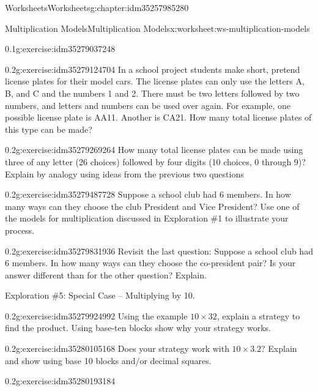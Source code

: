 \documentclass[twoside,11pt,]{book}
\begin{document}
\begin{chapterptx}{Worksheets}{}{Worksheets}{}{}{g:chapter:idm35257985280}
\begin{worksheet-section-numberless}{Multiplication Models}{}{Multiplication Models}{}{}{x:worksheet:ws-multiplication-models}
\begin{divisionexercise}{11}{}{0.1}{g:exercise:idm35279037248}
\end{divisionexercise}%
\clearpage
\begin{divisionexercise}{12}{}{0.2}{g:exercise:idm35279124704}%
In a school project students make short, pretend license plates for their model cars.  The license plates can only use the letters A, B, and C and the numbers 1 and 2.  There must be two letters followed by two numbers, and letters and numbers can be used over again.  For example, one possible license plate is AA11. Another is CA21. How many total license plates of this type can be made?%
\end{divisionexercise}%
\begin{divisionexercise}{13}{}{0.2}{g:exercise:idm35279269264}%
How many total license plates can be made using three of any letter (26 choices) followed by four digits (10 choices, 0 through 9)?  Explain by analogy using ideas from the previous two questions%
\end{divisionexercise}%
\begin{divisionexercise}{14}{}{0.2}{g:exercise:idm35279487728}%
Suppose a school club had 6 members. In how many ways can they choose the club President and Vice President? Use one of the models for multiplication discussed in Exploration \#1 to illustrate your process.%
\end{divisionexercise}%
\clearpage
\begin{divisionexercise}{15}{}{0.2}{g:exercise:idm35279831936}%
Revisit the last question: Suppose a school club had 6 members. In how many ways can they choose the co-president pair? Is your answer different than for the other question?  Explain.%
\end{divisionexercise}%
\begin{introduction}{}%
Exploration \#5: Special Case – Multiplying by 10.\end{introduction}%
\begin{divisionexercise}{16}{}{0.2}{g:exercise:idm35279924992}%
Using the example \(10 \times 32 \), explain a strategy to find the product. Using base-ten blocks show why your strategy works.%
\end{divisionexercise}%
\begin{divisionexercise}{17}{}{0.2}{g:exercise:idm35280105168}%
Does your strategy work with \(10 \times 3.2 \)? Explain and show using base 10 blocks and\slash{}or decimal squares.%
\end{divisionexercise}%
\clearpage
\begin{divisionexercise}{18}{}{0.2}{g:exercise:idm35280193184}%

\end{divisionexercise}
\end{worksheet-section-numberless}
\end{chapterptx}
\end{document}
